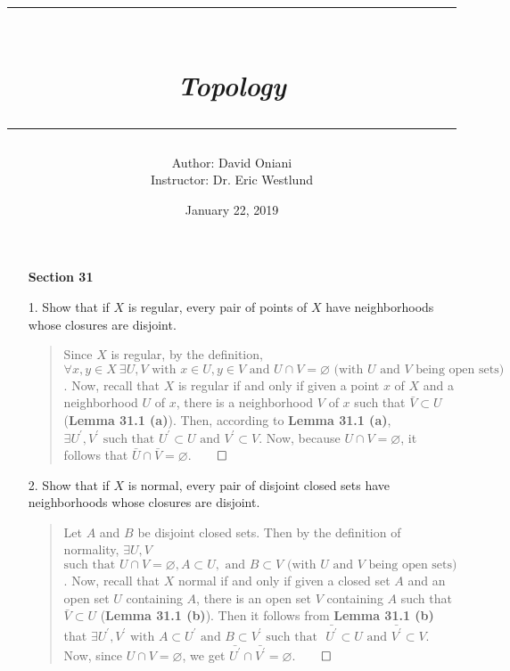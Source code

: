 \documentclass[12pt, a4paper]{article}
\title{\rule{\paperwidth - 150pt}{1pt}\textbf{\\\textit{Topology}\\}\rule{\paperwidth - 150pt}{1pt}}
\author
{
Author: David Oniani\\
Instructor: Dr. Eric Westlund
}
\date{January 22, 2019}
\renewcommand{\emptyset}{\varnothing}  %
\begin{document}
\maketitle


\begin{itemize}
\item[]
\item[]
{\large \textbf{Section 31}}
\vspace{0.3cm}

\item[1.]
Show that if $X$ is regular, every pair of points of $X$ have neighborhoods whose
closures are disjoint.
\begin{quote}
Since $X$ is regular, by the definition,
$\forall x, y \in X \ \exists U, V \mbox{ with } x \in U, y \in V \mbox{ and } U \cap V = \emptyset \mbox{ (with $U$ and $V$ being open sets)}$.
Now, recall that $X$ is regular if and only if given a point $x$ of $X$ and a neighborhood $U$ of $x$,
there is a neighborhood $V$ of $x$ such that $\bar{V} \subset U$ (\textbf{Lemma 31.1 (a)}). Then, according
to \textbf{Lemma 31.1 (a)}, $\exists U^\prime, V^\prime \mbox{ such that } U^\prime \subset U \mbox{ and } V^\prime \subset V$.
Now, because $U \cap V = \emptyset$, it follows that $\bar{U} \cap \bar{V} = \emptyset$.$\qed$
\end{quote}

\item[]
\item[]

\item[2.]
Show that if $X$ is normal, every pair of disjoint closed sets have neighborhoods whose
closures are disjoint.
\begin{quote}
Let $A$ and $B$ be disjoint closed sets. Then by the definition of normality, $\exists U, V$\\
$\mbox{such that } U \cap V = \emptyset, A \subset U, \mbox{ and } B \subset V \mbox{ (with $U$ and $V$ being open sets)}$.
Now, recall that $X$ normal if and only if given a closed set $A$ and an open set $U$ containing
$A$, there is an open set $V$ containing $A$ such that $\bar{V} \subset U$ (\textbf{Lemma 31.1 (b)}).
Then it follows from \textbf{Lemma 31.1 (b)} that $\exists U^\prime, V^\prime \mbox{ with }
A \subset U^\prime \mbox{ and } B \subset V^\prime \mbox{ such that }$
$\bar{U^\prime} \subset U \mbox{ and } \bar{V^\prime} \subset V$. Now, since $U \cap V = \emptyset$,
we get $\bar{U^\prime} \cap \bar{V^\prime} = \emptyset$.$\qed$
\end{quote}


\end{itemize}
\end{document}
